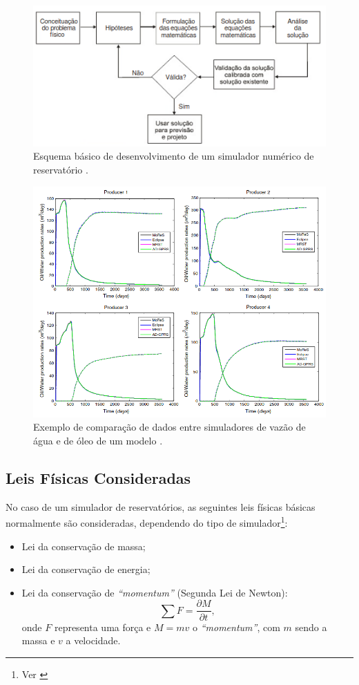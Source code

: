 \begin{figure}[!ht]
\centering
\includegraphics[width=.75\textwidth]{figs/revisao/revisao_simuesq.png}
\caption{Esquema básico de desenvolvimento de um simulador numérico de reservatório \cite[p. 519]{engres}.}\label{fig:rev_simuesq}
\end{figure}

\begin{figure}[!ht]
\centering
\includegraphics[width=.75\textwidth]{figs/revisao/revisao_simuex.png}
\caption{Exemplo de comparação de dados entre simuladores de vazão de água e de óleo de um modelo \cite{eggM}.}\label{fig:rev_simuex}
\end{figure}

\subsection{Leis Físicas Consideradas}

No caso de um simulador de reservatórios, as seguintes leis físicas básicas normalmente são consideradas, dependendo do tipo de simulador\footnote{Ver \cite[p. 520]{engres}}:

\begin{itemize}
\item Lei da conservação de massa;
\item Lei da conservação de energia;
\item Lei da conservação de \textit{``momentum''} (Segunda Lei de Newton):
\begin{equation}
\sum F = \frac{\partial M}{\partial t},
\end{equation}
onde $F$ representa uma força e $M = mv$ o \textit{``momentum''}, com $m$ sendo a massa e $v$ a velocidade.
\end{itemize}

